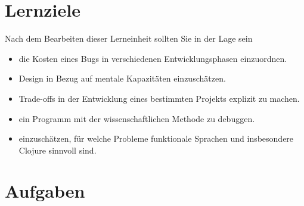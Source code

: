 \documentclass[11pt,a4paper]{article}
\theoremstyle{break}
\begin{document}
\section{Lernziele}

Nach dem Bearbeiten dieser Lerneinheit sollten Sie in der Lage sein

\begin{itemize}
    \item die Kosten eines Bugs in verschiedenen Entwicklungsphasen einzuordnen.
    \item Design in Bezug auf mentale Kapazit\"aten einzusch\"atzen.
    \item Trade-offs in der Entwicklung eines bestimmten Projekts explizit zu machen.
    \item ein Programm mit der wissenschaftlichen Methode zu debuggen.
    \item einzusch\"atzen, f\"ur welche Probleme funktionale Sprachen und insbesondere Clojure sinnvoll sind.
\end{itemize}



\section{Aufgaben}
\end{document}
